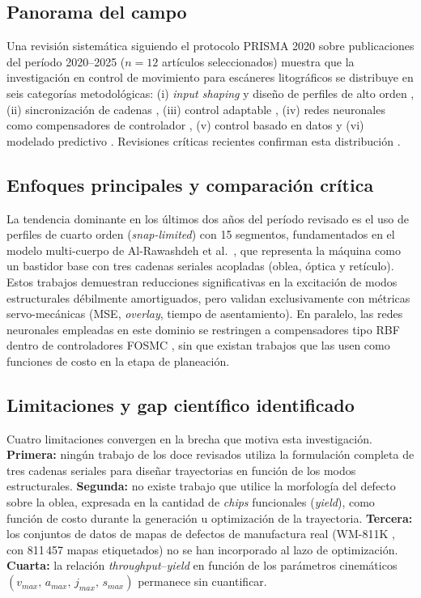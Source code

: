 \documentclass[11pt]{article}
\begin{document}
\subsection*{Panorama del campo}

Una revisión sistemática siguiendo el protocolo PRISMA 2020 \cite{Page2021_PRISMA} sobre publicaciones del período 2020--2025 ($n=12$ artículos seleccionados) muestra que la investigación en control de movimiento para escáneres litográficos se distribuye en seis categorías metodológicas: (i) \textit{input shaping} y diseño de perfiles de alto orden \cite{Al-Rawashdeh2023a,Al-Rawashdeh2023b,Heertjes2023_CDC}, (ii) sincronización de cadenas \cite{Al-Rawashdeh2021,Li2020}, (iii) control adaptable \cite{Kuang2021}, (iv) redes neuronales como compensadores de controlador \cite{Kuang2020}, (v) control basado en datos \cite{Al-Rawashdeh2024,Liu2024,Sun2024} y (vi) modelado predictivo \cite{Chen2023,Subramanian2024}. Revisiones críticas recientes confirman esta distribución \cite{Song2021_Review,Heertjes2020_Control,Heertjes2023_ICM}.

\subsection*{Enfoques principales y comparación crítica}

La tendencia dominante en los últimos dos años del período revisado es el uso de perfiles de cuarto orden (\textit{snap-limited}) con 15 segmentos, fundamentados en el modelo multi-cuerpo de Al-Rawashdeh et al.\ \cite{Al-Rawashdeh2022_Caracterization}, que representa la máquina como un bastidor base con tres cadenas seriales acopladas (oblea, óptica y retículo). Estos trabajos demuestran reducciones significativas en la excitación de modos estructurales débilmente amortiguados, pero validan exclusivamente con métricas servo-mecánicas (MSE, \textit{overlay}, tiempo de asentamiento). En paralelo, las redes neuronales empleadas en este dominio se restringen a compensadores tipo RBF dentro de controladores FOSMC \cite{Kuang2020}, sin que existan trabajos que las usen como funciones de costo en la etapa de planeación.

\subsection*{Limitaciones y gap científico identificado}

Cuatro limitaciones convergen en la brecha que motiva esta investigación. \textbf{Primera:} ningún trabajo de los doce revisados utiliza la formulación completa de tres cadenas seriales para diseñar trayectorias en función de los modos estructurales. \textbf{Segunda:} no existe trabajo que utilice la morfología del defecto sobre la oblea, expresada en la cantidad de \textit{chips} funcionales (\textit{yield}), como función de costo durante la generación u optimización de la trayectoria. \textbf{Tercera:} los conjuntos de datos de mapas de defectos de manufactura real (WM-811K \cite{Wu2015_WM811K}, con 811\,457 mapas etiquetados) no se han incorporado al lazo de optimización. \textbf{Cuarta:} la relación \textit{throughput}--\textit{yield} en función de los parámetros cinemáticos $(v_{max},\,a_{max},\,j_{max},\,s_{max})$ permanece sin cuantificar.
\end{document}
